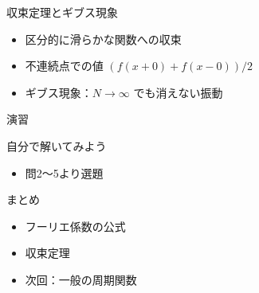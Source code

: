 \documentclass[aspectratio=43,professionalfonts,handout]{beamer}
\begin{document}
\begin{frame}{収束定理とギブス現象}
  \begin{block}{}
  \begin{itemize}
    \item 区分的に滑らかな関数への収束
    \item 不連続点での値 $(f(x+0)+f(x-0))/2$
    \item ギブス現象：$N \to \infty$ でも消えない振動
  \end{itemize}
  \end{block}
\end{frame}

\begin{frame}{演習}
  \begin{exampleblock}{自分で解いてみよう}
  \begin{itemize}
    \item 問2〜5より選題
  \end{itemize}
  \end{exampleblock}
\end{frame}

\begin{frame}{まとめ}
  \begin{itemize}
    \item フーリエ係数の公式
    \item 収束定理
    \item 次回：一般の周期関数
  \end{itemize}
\end{frame}
\end{document}
